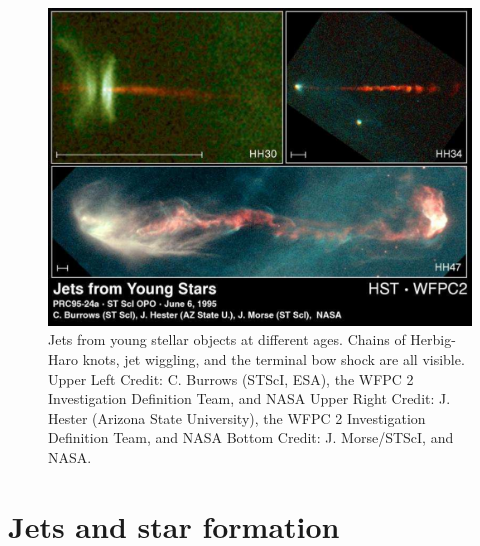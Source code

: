 \begin{figure}[t]
\centering
\includegraphics[width=\textwidth]{protostellar_jets}
\caption{
Jets from young stellar objects at different ages.
Chains of Herbig-Haro knots, jet wiggling, and the terminal bow shock are all visible.
Upper Left Credit: C. Burrows (STScI, ESA), the WFPC 2 Investigation Definition Team, and NASA
Upper Right Credit: J. Hester (Arizona State University), the WFPC 2 Investigation Definition Team, and NASA
Bottom Credit: J. Morse/STScI, and NASA.
}
\label{fig:jet} %
\end{figure}



\section{Jets and star formation}



